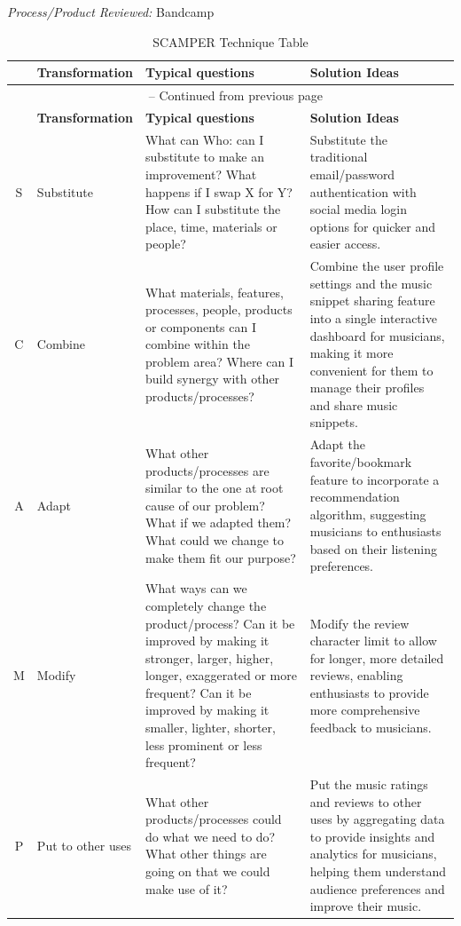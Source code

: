 \textit{Process/Product Reviewed:} Bandcamp
\begin{longtable}{|c|p{3cm}|p{4.5cm}|p{4.5cm}|}
\caption{SCAMPER Technique Table}
\label{tab:my_table}\\
\hline
\textbf{} & \textbf{Transformation} & \textbf{Typical questions} & \textbf{Solution Ideas} \\
\hline
\endfirsthead
\multicolumn{4}{c}{{\tablename\ \thetable{} -- Continued from previous page}} \\
\hline
\textbf{} & \textbf{Transformation} & \textbf{Typical questions} & \textbf{Solution Ideas} \\
\hline
\endhead

S & Substitute & What can Who: can I substitute to make an improvement? What happens if I swap X for Y? How can I substitute the place, time, materials or people? & Substitute the traditional email/password authentication with social media login options for quicker and easier access. \\
\hline
C & Combine & What materials, features, processes, people, products or components can I combine within the problem area? Where can I build synergy with other products/processes? & Combine the user profile settings and the music snippet sharing feature into a single interactive dashboard for musicians, making it more convenient for them to manage their profiles and share music snippets. \\
\hline
A & Adapt & What other products/processes are similar to the one at root cause of our problem? What if we adapted them? What could we change to make them fit our purpose? & Adapt the favorite/bookmark feature to incorporate a recommendation algorithm, suggesting musicians to enthusiasts based on their listening preferences. \\
\hline
M & Modify & What ways can we completely change the product/process? Can it be improved by making it stronger, larger, higher, longer, exaggerated or more frequent? Can it be improved by making it smaller, lighter, shorter, less prominent or less frequent? & Modify the review character limit to allow for longer, more detailed reviews, enabling enthusiasts to provide more comprehensive feedback to musicians. \\
\hline
P & Put to other uses & What other products/processes could do what we need to do? What other things are going on that we could make use of it? & Put the music ratings and reviews to other uses by aggregating data to provide insights and analytics for musicians, helping them understand audience preferences and improve their music. \\

\end{longtable}
